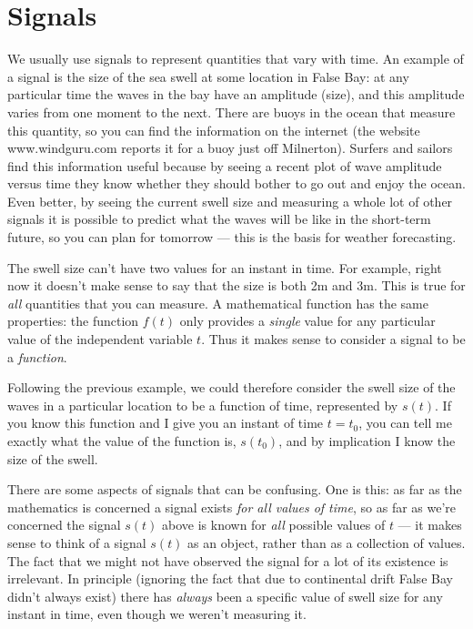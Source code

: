\documentclass[10pt]{beamer}
\begin{document}
\pagestyle{fancy}
\fancyhead{}
\renewcommand{\headrulewidth}{0pt}
\fancyfoot[C]{\thesection-\thepage}

\begin{frame}
  \titlepage
\end{frame}

\setcounter{section}{1}
\section{Signals}


We usually use signals to represent quantities that vary with time.  An example of a signal is the size of the sea swell at some location in False Bay:  at any particular time the waves in the bay have an amplitude (size), and this amplitude varies from one moment to the next.  There are buoys in the ocean that measure this quantity, so you can find the information on the internet (the website www.windguru.com reports it for a buoy just off Milnerton).  Surfers and sailors find this information useful because by seeing a recent plot of wave amplitude versus time they know whether they should bother to go out and enjoy the ocean.  Even better, by seeing the current swell size and measuring a whole lot of other signals it is possible to predict what the waves will be like in the short-term future, so you can plan for tomorrow --- this is the basis for weather forecasting.

The swell size can't have two values for an instant in time.  For example, right now it doesn't make sense to say that the size is both 2m and 3m.  This is true for {\em all} quantities that you can measure.  A mathematical function has the same properties:  the function $f(t)$ only provides a {\em single} value for any particular value of the independent variable $t$.  Thus it makes sense to consider a signal to be a {\em function}.

Following the previous example, we could therefore consider the swell size of the waves in a particular location to be a function of time, represented by $s(t)$.  If you know this function and I give you an instant of time $t = t_0$, you can tell me exactly what the value of the function is, $s(t_0)$, and by implication I know the size of the swell.

There are some aspects of signals that can be confusing.  One is this:  as far as the mathematics is concerned a signal exists {\em for all values of time}, so as far as we're concerned the signal $s(t)$ above is known for {\em all} possible values of $t$ --- it makes sense to think of a signal $s(t)$ as an object, rather than as a collection of values.  The fact that we might not have observed the signal for a lot of its existence is irrelevant.  In principle (ignoring the fact that due to continental drift False Bay didn't always exist) there has {\em always} been a specific value of swell size for any instant in time, even though we weren't measuring it.
\end{document}
